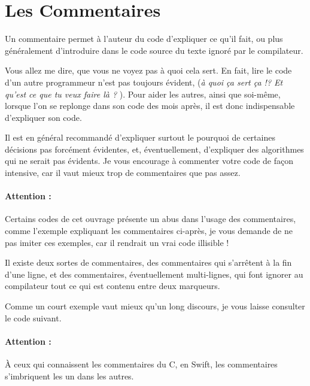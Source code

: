 \section{Les Commentaires}
Un commentaire permet à l’auteur du code d’expliquer ce qu’il fait,
ou plus généralement d’introduire dans le code source
du texte ignoré par le compilateur.

Vous allez me dire, que vous ne voyez pas à quoi cela sert.
En fait, lire le code d’un autre programmeur n’est pas toujours évident,
(\og \emph{à quoi ça sert ça !? Et qu’est ce que tu veux faire là ?} \fg{}).
Pour aider les autres, ainsi que soi-même,
lorsque l'on se replonge dans son code des mois après,
il est donc indispensable d’expliquer son code.

Il est en général recommandé d'expliquer surtout
le pourquoi de certaines décisions pas forcément évidentes,
et, éventuellement, d'expliquer des algorithmes qui ne serait pas évidents.
Je vous encourage à commenter votre code de façon intensive,
car il vaut mieux trop de commentaires que pas assez.

\paragraph{Attention :}
Certains codes de cet ouvrage présente un abus dans l'usage des commentaires,
comme l'exemple expliquant les commentaires ci-après,
je vous demande de ne pas imiter ces exemples,
car il rendrait un vrai code illisible !

Il existe deux sortes de commentaires,
des commentaires qui s'arrêtent à la fin d'une ligne,
et des commentaires, éventuellement multi-lignes,
qui font ignorer au compilateur tout ce qui est contenu entre deux marqueurs.

Comme un court exemple vaut mieux qu’un long discours,
je vous laisse consulter le code suivant.

\paragraph{Attention :} À ceux qui connaissent les commentaires du C,
en Swift, les commentaires s'imbriquent les un dans les autres.

